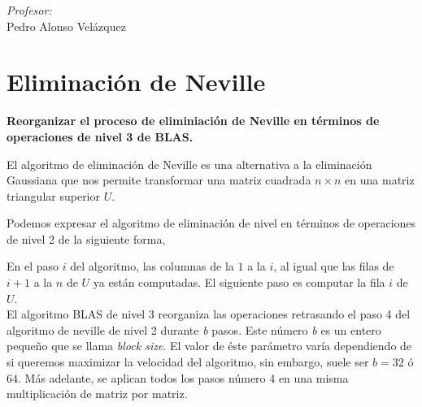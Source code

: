 \documentclass[a4paper,12pt]{article}
\begin{document}
\begin{titlepage}
\begin{center}
\begin{minipage}{0.4\textwidth}
\begin{flushright}
\emph{Profesor:} \\
Pedro Alonso Vel\'azquez\\
\end{flushright}
\end{minipage}

\end{center}


\end{titlepage}

\pagebreak
\tableofcontents
\pagebreak

\section{Eliminaci\'on de Neville}


\textbf{Reorganizar el proceso de eliminiaci\'on de Neville en t\'erminos de operaciones de nivel 3 de BLAS.}\\

\smallskip

El algoritmo de eliminaci\'on de Neville es una alternativa a la eliminaci\'on Gaussiana que nos permite transformar una matriz cuadrada $n\times n$  en una matriz triangular superior $U$.

Podemos expresar el algoritmo de eliminación de nivel en t\'erminos de operaciones de nivel 2 de la siguiente forma,\\

\begin{algorithmic}[1]\label{neville2}
		\ENDIF
	\ENDFOR
\end{algorithmic}

\bigskip

En el paso $i$ del algoritmo, las columnas de la $1$ a la $i$, al igual que las filas de $i+1$ a la $n$ de $U$ ya est\'an computadas. El siguiente paso es computar la fila $i$ de $U$. \\

El algoritmo BLAS de nivel 3 reorganiza las operaciones retrasando el paso 4 del algoritmo de neville de nivel 2 durante \textit{b} pasos. Este n\'umero \textit{b} es un entero peque\~no que se llama \textit{block size}. El valor de \'este par\'ametro var\'ia dependiendo de si queremos maximizar la velocidad del algoritmo, sin embargo, suele ser $b=32$ \'o $64$. M\'as adelante, se aplican todos los pasos n\'umero 4 en una misma multiplicaci\'on de matriz por matriz.\\
\end{document}
